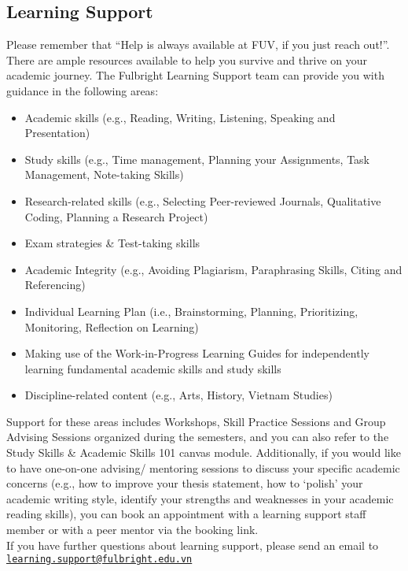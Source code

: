 \documentclass[
]{article}
\providecommand{\tightlist}{%
  \setlength{\itemsep}{0pt}\setlength{\parskip}{0pt}}
\begin{document}
\hypertarget{learning-support}{%
\subsection*{Learning Support}\label{learning-support}}

Please remember that ``Help is always available at FUV, if you just reach out!''. There are ample resources available to help you survive and thrive on your academic journey. The Fulbright Learning Support team can provide you with guidance in the following areas:

\begin{itemize}
\tightlist
\item
  Academic skills (e.g., Reading, Writing, Listening, Speaking and Presentation)
\item
  Study skills (e.g., Time management, Planning your Assignments, Task Management, Note-taking Skills)\\
\item
  Research-related skills (e.g., Selecting Peer-reviewed Journals, Qualitative Coding, Planning a Research Project)
\item
  Exam strategies \& Test-taking skills\\
\item
  Academic Integrity (e.g., Avoiding Plagiarism, Paraphrasing Skills, Citing and Referencing)
\item
  Individual Learning Plan (i.e., Brainstorming, Planning, Prioritizing, Monitoring, Reflection on Learning)
\item
  Making use of the Work-in-Progress Learning Guides for independently learning fundamental academic skills and study skills
\item
  Discipline-related content (e.g., Arts, History, Vietnam Studies)
\end{itemize}

Support for these areas includes Workshops, Skill Practice Sessions and Group Advising Sessions organized during the semesters, and you can also refer to the Study Skills \& Academic Skills 101 canvas module. Additionally, if you would like to have one-on-one advising/ mentoring sessions to discuss your specific academic concerns (e.g., how to improve your thesis statement, how to `polish' your academic writing style, identify your strengths and weaknesses in your academic reading skills), you can book an appointment with a learning support staff member or with a peer mentor via the booking link.\\
If you have further questions about learning support, please send an email to \href{mailto:learning.support@fulbright.edu.vn}{\nolinkurl{learning.support@fulbright.edu.vn}}
\end{document}
